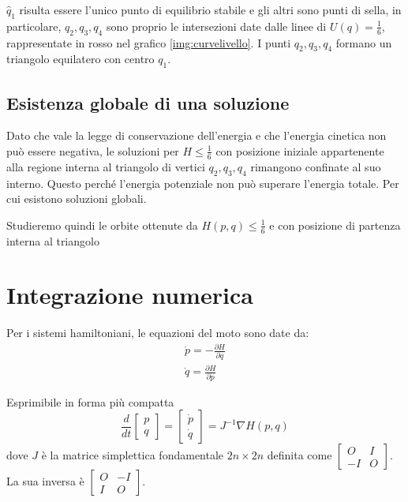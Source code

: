 \documentclass[a4paper]{article}
\numberwithin{equation}{section}
\numberwithin{figure}{section}
\begin{document}
$\hat{q}_1$ risulta essere l'unico punto di equilibrio stabile e gli altri sono punti di sella, in particolare,
$q_2, q_3, q_4$ sono proprio le intersezioni date dalle linee di $U(q)=\frac{1}{6}$, rappresentate in rosso nel
grafico \ref{img:curvelivello}. I punti $q_2, q_3, q_4$ formano un triangolo equilatero con centro $q_1$.

\subsection{Esistenza globale di una soluzione}
Dato che vale la legge di conservazione dell'energia e che l'energia cinetica non può essere negativa,
le soluzioni per $H \le \frac{1}{6}$ con posizione iniziale appartenente alla regione interna al triangolo
di vertici $q_2, q_3, q_4$ rimangono confinate al suo interno. Questo perché l'energia potenziale non può
superare l'energia totale. Per cui esistono soluzioni globali.

Studieremo quindi le orbite ottenute da $H(p,q) \le \frac{1}{6}$ e con posizione di partenza interna al triangolo

\section{Integrazione numerica}
Per i sistemi hamiltoniani, le equazioni del moto sono date da:
\begin{eqnarray}
	\dot{p} = -\frac{\partial H}{\partial q}\\
	\dot{q} = \frac{\partial H}{\partial p}
\end{eqnarray}

Esprimibile in forma più compatta
\begin{equation}
	\frac{d}{dt}
	\begin{bmatrix}
		p\\q
	\end{bmatrix} =
	\begin{bmatrix}
		\dot{p}\\\dot{q}
	\end{bmatrix} = 
	J^{-1}\nabla H(p,q)
\end{equation}
dove $J$ è la matrice simplettica fondamentale $2n\times 2n$ definita come $\begin{bmatrix}
O&I\\-I&O \end{bmatrix}$. La sua inversa è $\begin{bmatrix}
O&-I\\I&O \end{bmatrix}$.
\end{document}

